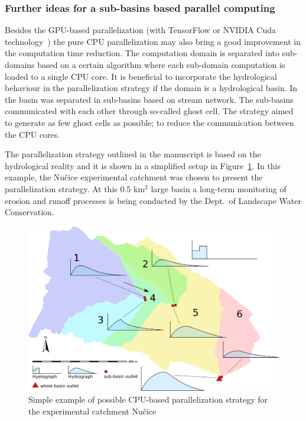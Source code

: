 \subsubsection{Further ideas for a sub-basins based parallel computing}
Besides the GPU-based parallelization (with TensorFlow \cite{tensorflow2015-whitepaper} or
NVIDIA Cuda technology~\cite{Kalyanapu2011,Le2015}) the
pure CPU parallelization may also bring a good improvement in the computation
time reduction. The computation domain is separated into sub-domains
based on a certain algorithm where each sub-domain computation is loaded to a single
CPU core.  It is beneficial to incorporate the
hydrological behaviour in the parallelization
strategy if the domain is a hydrological basin. 
In~\cite{Vivoni2011} the basin was separated in sub-basins
based on stream network. The sub-basins communicated with each other through so-called
ghost cell. The strategy aimed to generate as few ghost cells as
possible; to reduce the communication between the CPU cores. 

The parallelization strategy outlined in the manuscript is based on
the hydrological reality and it is shown in a simplified setup in Figure~\ref{fig:cpu-parallel}. In this example, the Nu\v{c}ice experimental catchment
was chosen to present the parallelization strategy. At this 0.5 km$^2$ large 
basin a long-term monitoring of erosion and runoff processes is being conducted 
by the Dept.\ of Landscape Water Conservation. 

\begin{figure}[ht!]
  \begin{center}
    \includegraphics[width=0.9\columnwidth]{figures/smoderp-cpu-parallel.png}
    \caption{Simple example of possible CPU-based parallelization strategy for the experimental catchment Nu\v{c}ice}
    \label{fig:cpu-parallel}
  \end{center}
\end{figure}

